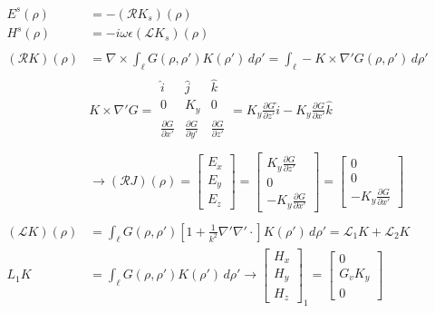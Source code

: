 \documentclass{article}
\newcommand{\0}{\varnothing}
\begin{document}
\begin{minipage}{0.45\textwidth}
\begin{align*}
    E^s(\rho) &= - (\mathcal{R}K_s)(\rho)\\
    H^s(\rho) &= -i\omega\epsilon(\mathcal{L}K_s)(\rho)\\ \\
    (\mathcal{R}K)(\rho) &= \nabla \times \int_{\ell}G(\rho,\rho')K(\rho') \,d\rho'
         = \int_{\ell} - K \times \nabla' G(\rho,\rho') \,d\rho'\\
    & K \times \nabla' G = 
    \begin{array}{|ccc|}
    \hat i & \hat j & \hat k\\
    0 & K_y & 0 \\
    \frac{\partial G}{\partial x'} & \frac{\partial G}{\partial y'} & \frac{\partial G}{\partial z'} \\
    \end{array}
       =  K_y \frac{\partial G}{\partial z'} \hat i - K_y \frac{\partial G}{\partial x'} \hat k\\
    & \rightarrow (\mathcal{R}J)(\rho) = \left[ \begin{array}{c} E_x \\ E_y \\ E_z \end{array} \right]  = 
      \left[ \begin{array}{c}  K_y \frac{\partial G}{\partial z'}\\ 0 \\-K_y \frac{\partial G}{\partial x'}  \end{array} \right] = 
      \left[ \begin{array}{c} 0\\ 0 \\-K_y \frac{\partial G}{\partial x'}  \end{array} \right]\\ \\
    (\mathcal{L}K)(\rho) &= \int_{\ell}G(\rho,\rho')[1+\frac{1}{k^2}\nabla'\nabla'\cdotp]K(\rho') \,d\rho' = \mathcal{L}_1 K + \mathcal{L}_2 K\\
    {L}_1 K &= \int_{\ell}G(\rho,\rho') K(\rho') \,d\rho' \rightarrow 
    \left[ \begin{array}{c} H_x \\ H_y \\ H_z \end{array} \right]_1 = \left[ \begin{array}{c} 0 \\ G_v K_y \\ 0 \end{array} \right]\\

\end{align*}
\end{minipage}
\end{document}
